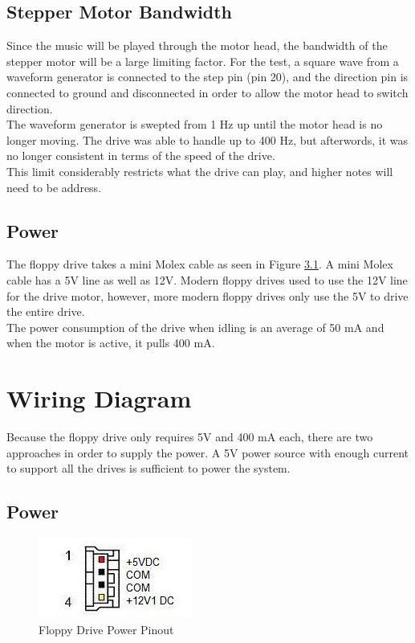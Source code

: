 \documentclass[11pt, a4paper]{report}
\begin{document}
\section{Stepper Motor Bandwidth}

Since the music will be played through the motor head, the bandwidth of the stepper motor will be a large limiting factor. For the test, a square wave from a waveform generator is connected to the step pin (pin 20), and the direction pin is connected to ground and disconnected in order to allow the motor head to switch direction. \\

The waveform generator is swepted from 1 Hz up until the motor head is no longer moving. The drive was able to handle up to 400 Hz, but afterwords, it was no longer consistent in terms of the speed of the drive. \\

This limit considerably restricts what the drive can play, and higher notes will need to be address. 


\section{Power}

The floppy drive takes a mini Molex cable as seen in Figure \ref{fig:miniMolex}. A mini Molex cable has a 5V line as well as 12V. Modern floppy drives used to use the 12V line for the drive motor, however, more modern floppy drives only use the 5V to drive the entire drive. \\

The power consumption of the drive when idling is an average of 50 mA and when the motor is active, it pulls 400 mA. \\


\chapter{Wiring Diagram}

Because the floppy drive only requires 5V and 400 mA each, there are two approaches in order to supply the power. A 5V power source with enough current to support all the drives is sufficient to power the system.
\section{Power}

\begin{figure}[H]
\hspace*{-2cm}    
    \centering
    \includegraphics[width=.3\textwidth]{miniMolex.jpg}
    \caption{Floppy Drive Power Pinout}
    \label{fig:miniMolex}
\end{figure}
\end{document}
